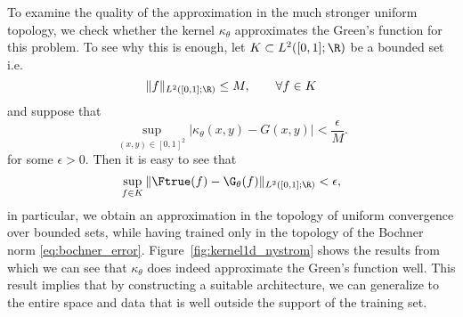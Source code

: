 To examine the quality of the approximation in the much stronger uniform topology, we check whether the kernel \(\kappa_\theta\) approximates the Green's function for this problem. To see why this is enough, let \(K \subset L^2([0,1];\R)\) be a bounded set i.e.
\[\|f\|_{L^2([0,1];\R)} \leq M, \qquad \forall f \in K\]
and suppose that
\[\sup_{(x,y) \in [0,1]^2} |\kappa_\theta(x,y) - G(x,y)| < \frac{\epsilon}{M}.\]
for some \(\epsilon > 0\). Then it is easy to see that
\[\sup_{f \in K} \|\Ftrue (f) - \G_\theta (f)\|_{L^2([0,1];\R)} < \epsilon,\]
in particular, we obtain an approximation in the topology of uniform convergence over bounded sets, while having trained only in the topology of the Bochner norm \eqref{eq:bochner_error}. Figure~\ref{fig:kernel1d_nystrom} shows the results from which we can see that \(\kappa_\theta\) does indeed approximate the Green's function well. This result implies that by constructing a suitable architecture, we can generalize to the entire space and data that is well outside the support of the training set.






